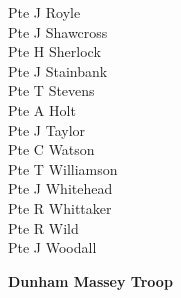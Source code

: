 \begin{multicols}{3}
  Pte J Royle \\
  Pte J Shawcross \\
  Pte H Sherlock \\
  Pte J Stainbank \\
  Pte T Stevens \\
  Pte A Holt \\
  Pte J Taylor \\
  Pte C Watson \\
  Pte T Williamson \\
  Pte J Whitehead \\
  Pte R Whittaker \\
  Pte R Wild \\
  Pte J Woodall \\
\end{multicols}

\vspace*{10mm}

\begin{center}
  \Large
  \textbf{Dunham Massey Troop}
\end{center}

